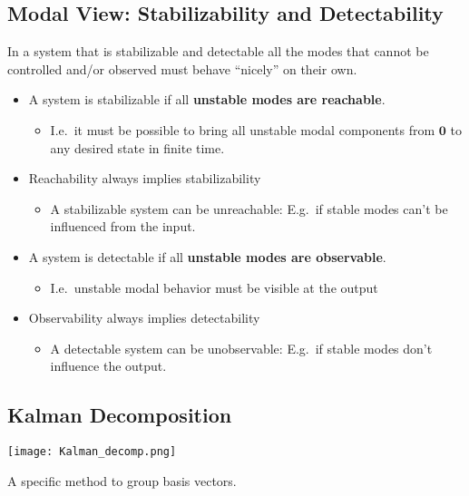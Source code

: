 \subsection{Modal View: Stabilizability and Detectability}
In a system that is stabilizable and detectable all the modes that cannot be controlled and/or observed must behave ``nicely'' on their own.

\newpar{}
\begin{itemize}
    \item A system is stabilizable if all \textbf{unstable modes are reachable}.
          \begin{itemize}
              \item I.e.\ it must be possible to bring all unstable modal components from $\mathbf{0}$ to any desired state in finite time.
          \end{itemize}
    \item Reachability always implies stabilizability
          \begin{itemize}
              \item A stabilizable system can be unreachable: E.g.\ if stable modes can't be influenced from the input.
          \end{itemize}
\end{itemize}

\newpar{}
\begin{itemize}
    \item A system is detectable if all \textbf{unstable modes are observable}.
          \begin{itemize}
              \item I.e.\ unstable modal behavior must be visible at the output
          \end{itemize}
    \item Observability always implies detectability
          \begin{itemize}
              \item A detectable system can be unobservable: E.g.\ if stable modes don't influence the output.
          \end{itemize}
\end{itemize}

\subsection{Kalman Decomposition}
\begin{center}
    \texttt{[image: Kalman\_decomp.png]}
\end{center}
A specific method to group basis vectors.

